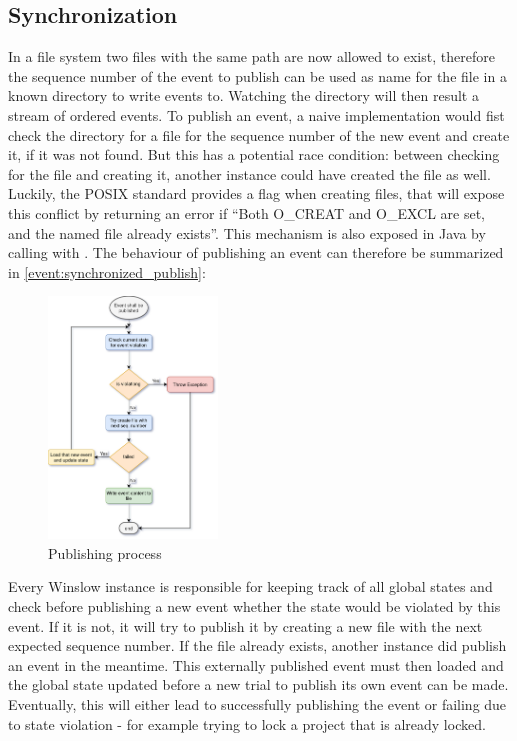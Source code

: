 \subsection{Synchronization}

In a file system two files with the same path are now allowed to exist, therefore the sequence number of the event to publish can be used as name for the file in a known directory to write events to.
Watching the directory will then result a stream of ordered events.
To publish an event, a naive implementation would fist check the directory for a file for the sequence number of the new event and create it, if it was not found.
But this has a potential race condition: between checking for the file and creating it, another instance could have created the file as well.
Luckily, the POSIX standard provides a flag when creating files, that will expose this conflict by returning an error if \enquote{Both O\_CREAT and O\_EXCL are set, and the named file already exists}\cite{gnu:open}.
This mechanism is also exposed in Java by calling \cite{javadoc:files:write} with \cite{javadoc:standard_open_options:create_new}.
The behaviour of publishing an event can therefore be summarized in \autoref{event:synchronized_publish}:

\begin{figure}
	\centering
	\includegraphics[width=0.4\textwidth]{event_publishing.png}
	\caption{Publishing process}
	\label{event:synchronized_publish}
\end{figure}

Every Winslow instance is responsible for keeping track of all global states and check before publishing a new event  whether the state would be violated by this event.
If it is not, it will try to publish it by creating a new file with the next expected sequence number.
If the file already exists, another instance did publish an event in the meantime.
This externally published event must then loaded and the global state updated before a new trial to publish its own event can be made.
Eventually, this will either lead to successfully publishing the event or failing due to state violation - for example trying to lock a project that is already locked.


